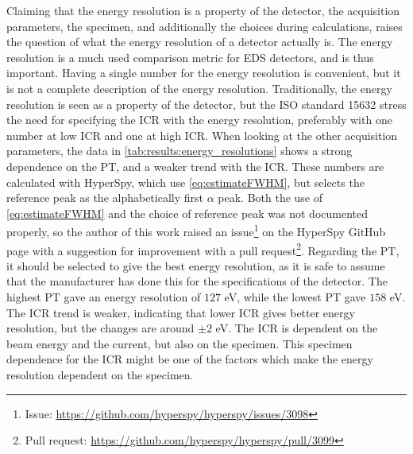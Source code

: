 Claiming that the energy resolution is a property of the detector, the acquisition parameters, the specimen, and additionally the choices during calculations, raises the question of what the energy resolution of a detector actually is.
The energy resolution is a much used comparison metric for EDS detectors, and is thus important.
Having a single number for the energy resolution is convenient, but it is not a complete description of the energy resolution.
Traditionally, the energy resolution is seen as a property of the detector, but the ISO standard 15632 \cite{iso_qc_15632} stress the need for specifying the ICR with the energy resolution, preferably with one number at low ICR and one at high ICR.
When looking at the other acquisition parameters, the data in \cref{tab:results:energy_resolutions} shows a strong dependence on the PT, and a weaker trend with the ICR.
These numbers are calculated with HyperSpy, which use \cref{eq:estimateFWHM}, but selects the reference peak as the alphabetically first $\alpha$ peak.
Both the use of \cref{eq:estimateFWHM} and the choice of reference peak was not documented properly, so the author of this work raised an issue\footnote{Issue: \url{https://github.com/hyperspy/hyperspy/issues/3098}} on the HyperSpy GitHub page with a suggestion for improvement with a pull request\footnote{Pull request: \url{https://github.com/hyperspy/hyperspy/pull/3099}}.
Regarding the PT, it should be selected to give the best energy resolution, as it is safe to assume that the manufacturer has done this for the specifications of the detector.
The highest PT gave an energy resolution of $127$ eV, while the lowest PT gave $158$ eV.
The ICR trend is weaker, indicating that lower ICR gives better energy resolution, but the changes are around $\pm 2$ eV.
The ICR is dependent on the beam energy and the current, but also on the specimen.
This specimen dependence for the ICR might be one of the factors which make the energy resolution dependent on the specimen.


